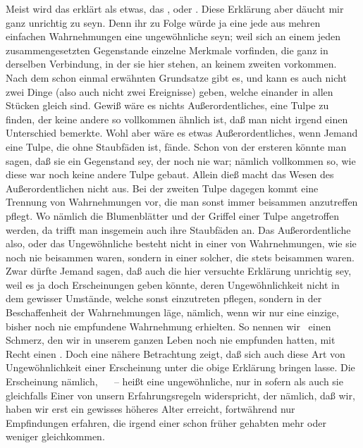 \begin{RWanm} 
Meist wird das  erklärt als etwas, das , oder . Diese Erklärung aber däucht mir ganz unrichtig zu seyn. Denn ihr zu Folge würde ja eine jede aus mehren einfachen Wahrnehmungen  eine ungewöhnliche seyn; weil sich an einem jeden zusammengesetzten Gegenstande einzelne Merkmale vorfinden, die ganz in derselben Verbindung, in der sie hier stehen, an keinem zweiten vorkommen. Nach dem schon einmal erwähnten Grundsatze  gibt es, und kann es auch nicht zwei Dinge (also auch nicht zwei Ereignisse) geben, welche einander in allen Stücken gleich sind. Gewiß wäre es nichts Außerordentliches, eine Tulpe zu finden, der keine andere so vollkommen ähnlich ist, daß man nicht irgend einen Unterschied bemerkte. Wohl aber wäre es etwas Außerordentliches, wenn Jemand eine Tulpe, die ohne Staubfäden ist, fände. Schon von der ersteren könnte man sagen, daß sie ein Gegenstand sey, der noch nie war; nämlich vollkommen so, wie diese war noch keine andere Tulpe gebaut. Allein dieß macht das Wesen des Außerordentlichen nicht aus. Bei der zweiten Tulpe dagegen kommt eine Trennung von Wahrnehmungen vor, die man sonst immer beisammen anzutreffen pflegt. Wo nämlich die Blumenblätter und der Griffel einer Tulpe angetroffen werden, da trifft man insgemein auch ihre Staubfäden an. Das Außerordentliche also, oder das Ungewöhnliche besteht nicht in einer  von Wahrnehmungen, wie sie noch nie beisammen waren, sondern in einer  solcher, die stets beisammen waren. Zwar dürfte Jemand sagen, daß auch die hier versuchte Erklärung unrichtig sey, weil es ja doch Erscheinungen geben könnte, deren Ungewöhnlichkeit nicht in dem  gewisser Umstände, welche sonst einzutreten pflegen, sondern in der Beschaffenheit der Wahrnehmungen  läge, nämlich, wenn wir nur eine einzige, bisher noch nie empfundene Wahrnehmung erhielten. So nennen wir \zB\ einen Schmerz, den wir in unserem ganzen Leben noch nie empfunden hatten, mit Recht einen . Doch eine nähere Betrachtung zeigt, daß sich auch diese Art von Ungewöhnlichkeit einer Erscheinung unter die obige Erklärung bringen lasse. Die Erscheinung nämlich, ~\  -- heißt eine ungewöhnliche, nur in sofern als auch sie gleichfalls Einer von unsern Erfahrungsregeln widerspricht, der nämlich, daß wir, haben wir erst ein gewisses höheres Alter erreicht, fortwährend nur Empfindungen erfahren, die irgend einer schon früher gehabten mehr oder weniger gleichkommen.
\end{RWanm}
   
